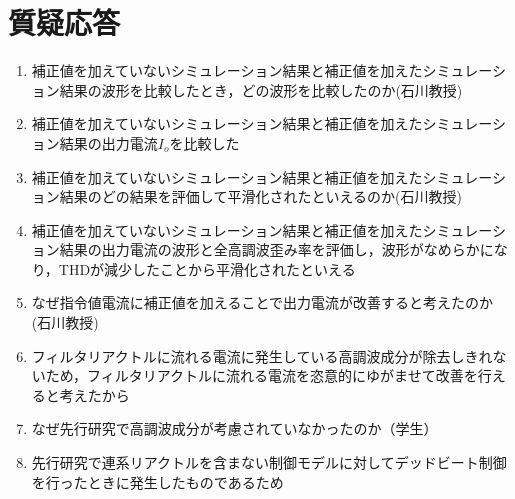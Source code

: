 
\chapter{質疑応答}
\label{chap:first}
\begin{enumerate}
\item[Q1．]補正値を加えていないシミュレーション結果と補正値を加えたシミュレーション結果の波形を比較したとき，どの波形を比較したのか(石川教授)
\item[A1．]補正値を加えていないシミュレーション結果と補正値を加えたシミュレーション結果の出力電流$I_o$を比較した
\item[Q2．]補正値を加えていないシミュレーション結果と補正値を加えたシミュレーション結果のどの結果を評価して平滑化されたといえるのか(石川教授)
\item[A2．]補正値を加えていないシミュレーション結果と補正値を加えたシミュレーション結果の出力電流の波形と全高調波歪み率を評価し，波形がなめらかになり，THDが減少したことから平滑化されたといえる
\item[Q3．]なぜ指令値電流に補正値を加えることで出力電流が改善すると考えたのか(石川教授)
\item[A3．]フィルタリアクトルに流れる電流に発生している高調波成分が除去しきれないため，フィルタリアクトルに流れる電流を恣意的にゆがませて改善を行えると考えたから
\item[Q4．]なぜ先行研究で高調波成分が考慮されていなかったのか（学生）
\item[A4．]先行研究で連系リアクトルを含まない制御モデルに対してデッドビート制御を行ったときに発生したものであるため
\end{enumerate}